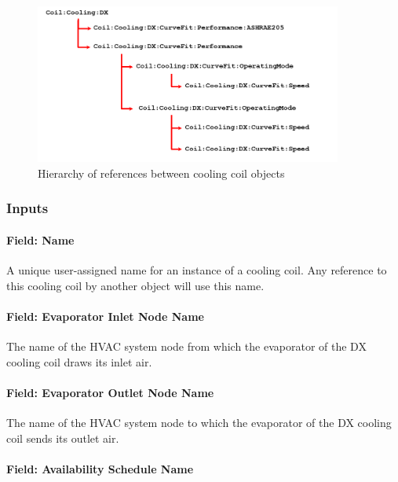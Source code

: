 \begin{figure}[hbtp] %
\centering
\includegraphics[width=0.9\textwidth, height=0.9\textheight, keepaspectratio=true]{media/cooling-coil-hierarchy.png}
\caption{Hierarchy of references between cooling coil objects \protect \label{fig:diagram-of-coil-object-references}}
\end{figure}

\subsubsection{Inputs}\label{inputs-01}

\paragraph{Field: Name}\label{field-name-01}

A unique user-assigned name for an instance of a cooling coil. Any reference to this cooling coil by another object will use this name.

\paragraph{Field: Evaporator Inlet Node Name}\label{field-evaporator-inlet-node-name-021}

The name of the HVAC system node from which the evaporator of the DX cooling coil draws its inlet air.

\paragraph{Field: Evaporator Outlet Node Name}\label{field-evaporator-outlet-node-name-021}

The name of the HVAC system node to which the evaporator of the DX cooling coil sends its outlet air.

\paragraph{Field: Availability Schedule Name}

